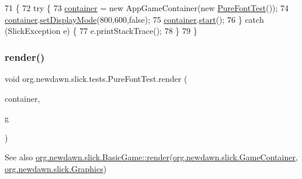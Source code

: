 \begin{DoxyCode}
71                                            \{
72         \textcolor{keywordflow}{try} \{
73             \mbox{\hyperlink{classorg_1_1newdawn_1_1slick_1_1tests_1_1_pure_font_test_afb97856ff89ea6b4957e845fcba255fe}{container}} = \textcolor{keyword}{new} AppGameContainer(\textcolor{keyword}{new} \mbox{\hyperlink{classorg_1_1newdawn_1_1slick_1_1tests_1_1_pure_font_test_a13e63fb95747ce5891d5e790446988d0}{PureFontTest}}());
74             \mbox{\hyperlink{classorg_1_1newdawn_1_1slick_1_1tests_1_1_pure_font_test_afb97856ff89ea6b4957e845fcba255fe}{container}}.\mbox{\hyperlink{classorg_1_1newdawn_1_1slick_1_1_app_game_container_aa2de68db61ddd3917a8edc0177ebdfe3}{setDisplayMode}}(800,600,\textcolor{keyword}{false});
75             \mbox{\hyperlink{classorg_1_1newdawn_1_1slick_1_1tests_1_1_pure_font_test_afb97856ff89ea6b4957e845fcba255fe}{container}}.\mbox{\hyperlink{classorg_1_1newdawn_1_1slick_1_1_app_game_container_adcadc0e560e64d03be24c817931fdd54}{start}}();
76         \} \textcolor{keywordflow}{catch} (SlickException e) \{
77             e.printStackTrace();
78         \}
79     \}
\end{DoxyCode}
\mbox{\label{classorg_1_1newdawn_1_1slick_1_1tests_1_1_pure_font_test_a2a5d9e4f0b8dc1a768304c9747cede17}} 
\subsubsection{\texorpdfstring{render()}{render()}}
{\footnotesize\ttfamily void org.\+newdawn.\+slick.\+tests.\+Pure\+Font\+Test.\+render (\begin{DoxyParamCaption}\item[{\mbox{\hyperlink{classorg_1_1newdawn_1_1slick_1_1_game_container}{Game\+Container}}}]{container,  }\item[{\mbox{\hyperlink{classorg_1_1newdawn_1_1slick_1_1_graphics}{Graphics}}}]{g }\end{DoxyParamCaption})\hspace{0.3cm}{\ttfamily [inline]}}

\begin{DoxySeeAlso}{See also}
\mbox{\hyperlink{interfaceorg_1_1newdawn_1_1slick_1_1_game_af1a4670d43eb3ba04dfcf55ab1975b64}{org.\+newdawn.\+slick.\+Basic\+Game\+::render}}(\mbox{\hyperlink{classorg_1_1newdawn_1_1slick_1_1_game_container}{org.\+newdawn.\+slick.\+Game\+Container}}, \mbox{\hyperlink{classorg_1_1newdawn_1_1slick_1_1_graphics}{org.\+newdawn.\+slick.\+Graphics}}) 
\end{DoxySeeAlso}


